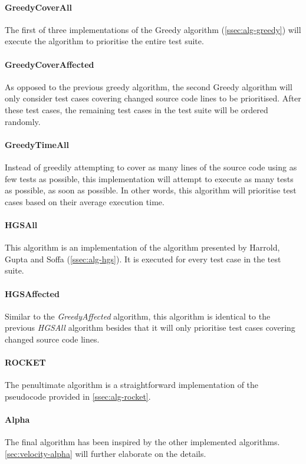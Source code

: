 \paragraph*{GreedyCoverAll} The first of three implementations of the Greedy algorithm (\autoref{ssec:alg-greedy}) will execute the algorithm to prioritise the entire test suite.

\paragraph*{GreedyCoverAffected} As opposed to the previous greedy algorithm, the second Greedy algorithm will only consider test cases covering changed source code lines to be prioritised. After these test cases, the remaining test cases in the test suite will be ordered randomly.

\paragraph*{GreedyTimeAll} Instead of greedily attempting to cover as many lines of the source code using as few tests as possible, this implementation will attempt to execute as many tests as possible, as soon as possible. In other words, this algorithm will prioritise test cases based on their average execution time.

\paragraph*{HGSAll} This algorithm is an implementation of the algorithm presented by Harrold, Gupta and Soffa (\autoref{ssec:alg-hgs}). It is executed for every test case in the test suite.

\paragraph*{HGSAffected} Similar to the \emph{GreedyAffected} algorithm, this algorithm is identical to the previous \emph{HGSAll} algorithm besides that it will only prioritise test cases covering changed source code lines.

\paragraph*{ROCKET} The penultimate algorithm is a straightforward implementation of the pseudocode provided in \autoref{ssec:alg-rocket}.

\paragraph*{Alpha} The final algorithm has been inspired by the other implemented algorithms. \autoref{sec:velocity-alpha} will further elaborate on the details.\\

